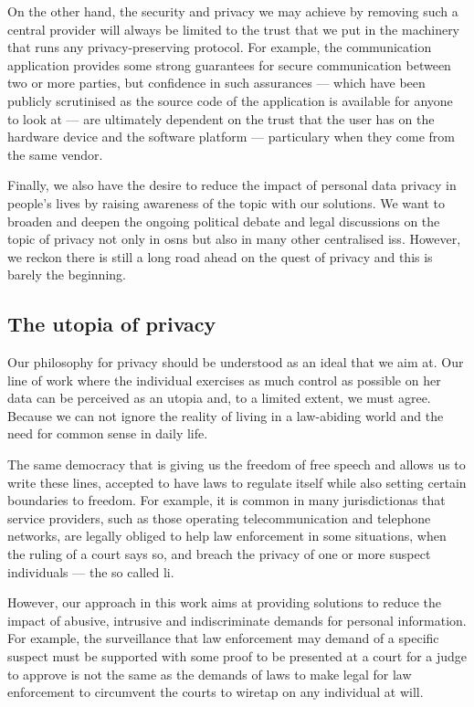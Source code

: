 On the other hand, the security and privacy we may achieve by removing such a central 
provider will always be limited to the trust that we put in the machinery that runs 
any privacy-preserving protocol. For example, the communication application \Signal 
provides some strong guarantees for secure communication between two or more parties, 
but confidence in such assurances --- which have been publicly scrutinised as 
the source code of the application is available for anyone to look at --- are ultimately 
dependent on the trust that the user has on the hardware device and the software platform 
--- particulary when they come from the same vendor.

Finally, we also have the desire to reduce the impact of personal data privacy in 
people's lives by raising awareness of the topic with our solutions. We want to 
broaden and deepen the ongoing political debate and legal discussions on the topic 
of privacy not only in \acp{osn} but also in many other centralised \acp{is}. However, 
we reckon there is still a long road ahead on the quest of privacy and this is barely 
the beginning.

\subsection{The utopia of privacy}
    \label{subsection:thesis:utopia-of-privacy}
Our philosophy for privacy should be understood as an ideal that we aim at. Our line 
of work where the individual exercises as much control as possible on her data can 
be perceived as an utopia and, to a limited extent, we must agree. Because we can 
not ignore the reality of living in a law-abiding world and the need for common 
sense in daily life. 

The same democracy that is giving us the freedom of free speech and allows us to 
write these lines, accepted to have laws to regulate itself while also setting certain 
boundaries to freedom. For example, it is common in many jurisdictionas that service 
providers, such as those operating telecommunication and telephone networks, are 
legally obliged to help law enforcement in some situations, when the ruling of a 
court says so, and breach the privacy of one or more suspect individuals --- the 
so called \ac{li}.

However, our approach in this work aims at providing solutions to reduce the impact 
of abusive, intrusive and indiscriminate demands for personal information. For example, 
the surveillance that law enforcement may demand of a specific suspect must be supported 
with some proof to be presented at a court for a judge to approve is not the same 
as the demands of laws to make legal for law enforcement to circumvent the courts 
to wiretap on any individual at will.

